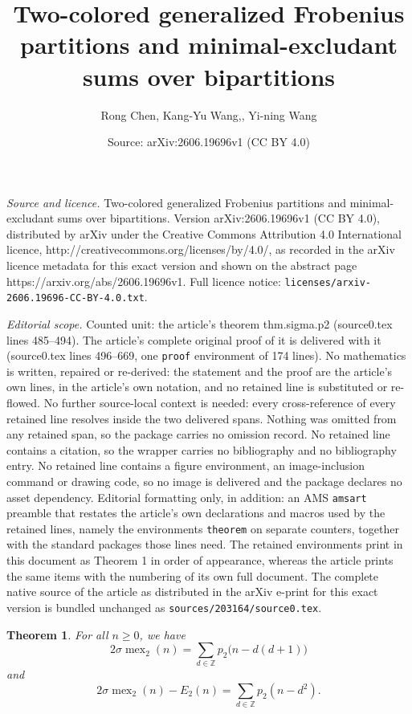 \documentclass[10pt,a4paper]{amsart}
\title{Two-colored generalized Frobenius partitions and minimal-excludant sums over bipartitions}
\author{Rong Chen, Kang-Yu Wang,, Yi-ning Wang}
\date{Source: arXiv:2606.19696v1 (CC BY 4.0)}
\newtheorem{theorem}{Theorem}
\newcommand{\mex}{\operatorname{mex}}
\begin{document}
\maketitle

\noindent\emph{Source and licence.} Two-colored generalized Frobenius partitions and minimal-excludant sums over bipartitions. Version arXiv:2606.19696v1 (CC BY 4.0), distributed by arXiv under the Creative Commons Attribution 4.0 International licence, http://creativecommons.org/licenses/by/4.0/, as recorded in the arXiv licence metadata for this exact version and shown on the abstract page https://arxiv.org/abs/2606.19696v1. Full licence notice: \texttt{licenses/arxiv-2606.19696-CC-BY-4.0.txt}.\par\smallskip

\noindent\textit{Editorial scope.} Counted unit: the article's theorem thm.sigma.p2 (source0.tex lines 485--494). The article's complete original proof of it is delivered with it (source0.tex lines 496--669, one \texttt{proof} environment of 174 lines). No mathematics is written, repaired or re-derived: the statement and the proof are the article's own lines, in the article's own notation, and no retained line is substituted or re-flowed.  No further source-local context is needed: every cross-reference of every retained line resolves inside the two delivered spans.  Nothing was omitted from any retained span, so the package carries no omission record.  No retained line contains a citation, so the wrapper carries no bibliography and no bibliography entry.  No retained line contains a figure environment, an image-inclusion command or drawing code, so no image is delivered and the package declares no asset dependency.  Editorial formatting only, in addition: an AMS \texttt{amsart} preamble that restates the article's own declarations and macros used by the retained lines, namely the environments \texttt{theorem} on separate counters, together with the standard packages those lines need.  The retained environments print in this document as Theorem 1 in order of appearance, whereas the article prints the same items with the numbering of its own full document.  The complete native source of the article as distributed in the arXiv e-print for this exact version is bundled unchanged as \texttt{sources/203164/source0.tex}.
\begin{theorem}\label{thm.sigma.p2}
For all $n\geq 0$, we have
\[
2\sigma\mex_2(n)=\sum_{d\in\mathbb Z}p_2\bigl(n-d(d+1)\bigr)
\]
and
\[
2\sigma\mex_2(n)-E_2(n)=\sum_{d\in\mathbb Z}p_2(n-d^2).
\]
\end{theorem}
\end{document}
